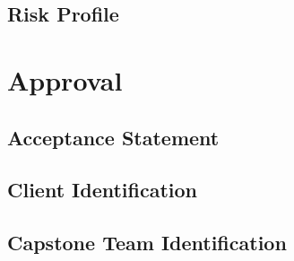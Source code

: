 \documentclass[10pt,letterpaper]{article}
\begin{document}
\subsection{Risk Profile}


\section{Approval}


\subsection{Acceptance Statement}


\subsection{Client Identification}


\subsection{Capstone Team Identification}



\clearpage
{}



\end{document}
